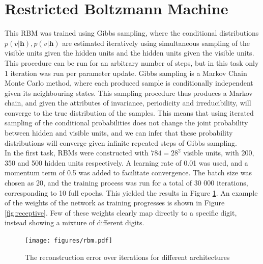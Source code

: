 \documentclass[a4paper]{article}
\begin{document}
\section{Restricted Boltzmann Machine}
This RBM was trained using Gibbs sampling, where the conditional distributions $p(v\vert\mathbf{h}), p(v\vert\mathbf{h})$ are estimated iteratively using simultaneous sampling of the visible units given the hidden units and the hidden units given the visible units. This procedure can be run for an arbitrary number of steps, but in this task only 1 iteration was run per parameter update. Gibbs sampling is a Markov Chain Monte Carlo method, where each produced sample is conditionally independent given its neighbouring states. This sampling procedure thus produces a Markov chain, and given the attributes of invariance, periodicity and irreducibility, will converge to the true distribution of the samples. This means that using iterated sampling of the conditional probabilities does not change the joint probability between hidden and visible units, and we can infer that these probability distributions will converge given infinite repeated steps of Gibbs sampling. \\
In the first task, RBMs were constructed with $784 = 28^2$ visible units, with 200, 350 and 500 hidden units respectively. A learning rate of 0.01 was used, and a momentum term of 0.5 was added to facilitate convergence. The batch size was chosen as 20, and the training process was run for a total of 30 000 iterations, corresponding to 10 full epochs. This yielded the results in Figure \ref{fig:rbm}. An example of the weights of the network as training progresses is shown in Figure \ref{fig:receptive}. Few of these weights clearly map directly to a specific digit, instead showing a mixture of different digits.

\begin{figure}[ht]
   \centering
   \texttt{[image: figures/rbm.pdf]}
   \caption{The reconstruction error over iterations for different architectures}
   \label{fig:rbm}
\end{figure}
\end{document}
